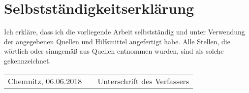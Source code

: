 \section*{Selbstständigkeitserklärung}


Ich erkläre, dass ich die vorliegende Arbeit selbstständig und unter Verwendung der angegebenen
Quellen und Hilfsmittel angefertigt habe. Alle Stellen, die wörtlich oder sinngemäß aus Quellen
entnommen wurden, sind als solche gekennzeichnet.

\vspace{2cm}

\begin{tabularx}{\columnwidth}{lXr}
  \hline 
  Chemnitz, 06.06.2018 &  &Unterschrift des Verfassers
\end{tabularx}
